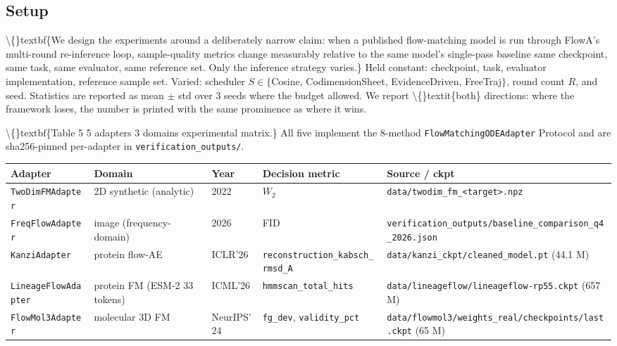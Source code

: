 \documentclass[preprint,3p,times,twocolumn]{elsarticle}
\begin{document}
\subsection{Setup}
\textbackslash\{\}textbf\{We design the experiments around a deliberately narrow claim: when a published flow-matching model is run through FlowA's multi-round re-inference loop, sample-quality metrics change measurably relative to the same model's single-pass baseline  same checkpoint, same task, same evaluator, same reference set. Only the inference strategy varies.\} Held constant: checkpoint, task, evaluator implementation, reference sample set. Varied: scheduler $S \in \{$Cosine, CodimensionSheet, EvidenceDriven, FreeTraj$\}$, round count $R$, and seed. Statistics are reported as mean $\pm$ std over 3 seeds where the budget allowed. We report \textbackslash\{\}textit\{both\} directions: where the framework loses, the number is printed with the same prominence as where it wins.

\textbackslash\{\}textbf\{Table 5  5 adapters  3 domains experimental matrix.\} All five implement the 8-method \texttt{FlowMatchingODEAdapter} Protocol and are sha256-pinned per-adapter in \texttt{verification\_outputs/}.

\begin{table}[ht]
\centering
\small
\begin{tabular}{lllll}
\hline
\textbf{Adapter} & \textbf{Domain} & \textbf{Year} & \textbf{Decision metric} & \textbf{Source / ckpt} \\
\hline
\texttt{TwoDimFMAdapter} & 2D synthetic (analytic) & 2022 & $W_2$ & \texttt{data/twodim\_fm\_<target>.npz} \\
\texttt{FreqFlowAdapter} & image (frequency-domain) & 2026 & FID & \texttt{verification\_outputs/baseline\_comparison\_q4\_2026.json} \\
\texttt{KanziAdapter} & protein flow-AE & ICLR'26 & \texttt{reconstruction\_kabsch\_rmsd\_A} & \texttt{data/kanzi\_ckpt/cleaned\_model.pt} (44.1 M) \\
\texttt{LineageFlowAdapter} & protein FM (ESM-2 33 tokens) & ICML'26 & \texttt{hmmscan\_total\_hits} & \texttt{data/lineageflow/lineageflow-rp55.ckpt} (657 M) \\
\texttt{FlowMol3Adapter} & molecular 3D FM & NeurIPS'24 & \texttt{fg\_dev}, \texttt{validity\_pct} & \texttt{data/flowmol3/weights\_real/checkpoints/last.ckpt} (65 M) \\
\hline
\end{tabular}
\end{table}
\end{document}

